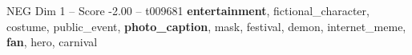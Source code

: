 \begin{textsample}{NEG Dim 1 – Score -2.00 – t009681}  \label{ex:f1_neg_016}
\textbf{entertainment}, fictional\_character, costume, public\_event, \textbf{photo\_caption}, mask, festival, demon, internet\_meme, \textbf{fan}, hero, carnival

\end{textsample}

